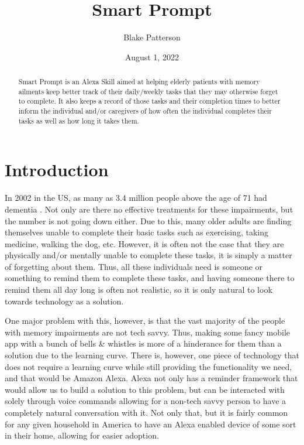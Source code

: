 \documentclass[11pt, oneside]{article}
\begin{document}
\title{Smart Prompt}
\author{Blake Patterson}
\date{August 1, 2022}
\maketitle

\begin{abstract}
Smart Prompt is an Alexa Skill aimed at helping elderly patients with memory ailments keep better track of their daily/weekly tasks that they may otherwise forget to complete. 
It also keeps a record of those tasks and their completion times to better inform the individual and/or caregivers of how often the individual completes their tasks as well as how long it takes them. 
\end{abstract}

\newpage
\tableofcontents
\newpage
{}


\section{Introduction}

In 2002 in the US, as many as 3.4 million people above the age of 71 had dementia \cite{b4}. 
Not only are there no effective treatments for these impairments, but the number is not going down either. 
Due to this, many older adults are finding themselves unable to complete their basic tasks such as exercising, taking medicine, walking the dog, etc.
However, it is often not the case that they are physically and/or mentally unable to complete these tasks, it is simply a matter of forgetting about them. 
Thus, all these individuals need is someone or something to remind them to complete these tasks, and having someone there to remind them all day long is often not realistic, so it is only natural to look towards technology as a solution. 

One major problem with this, however, is that the vast majority of the people with memory impairments are not tech savvy. 
Thus, making some fancy mobile app with a bunch of bells \& whistles is more of a hinderance for them than a solution due to the learning curve. 
There is, however, one piece of technology that does not require a learning curve while still providing the functionality we need, and that would be Amazon Alexa. 
Alexa not only has a reminder framework that would allow us to build a solution to this problem, but can be interacted with solely through voice commands allowing for a non-tech savvy person to have a completely natural conversation with it. 
Not only that, but it is fairly common for any given household in America to have an Alexa enabled device of some sort in their home, allowing for easier adoption. 
\end{document}
